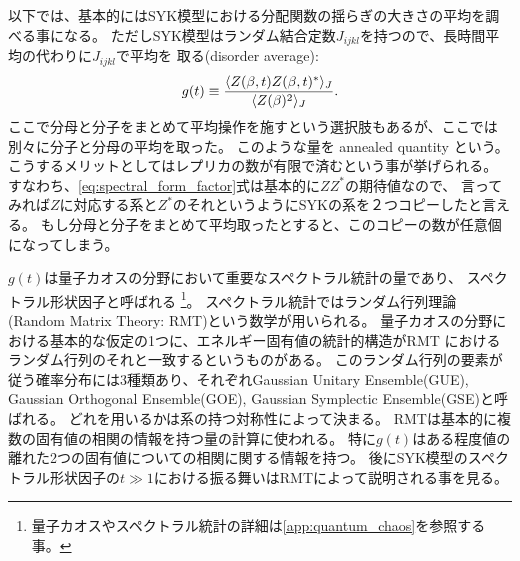 以下では、基本的にはSYK模型における分配関数の揺らぎの大きさの平均を調べる事になる。
ただしSYK模型はランダム結合定数$J_{ijkl}$を持つので、長時間平均の代わりに$J_{ijkl}$で平均を
取る(disorder average):
\begin{align}
	g(t) \equiv
	\frac{\langle Z(\beta, t)Z(\beta, t)^* \rangle_J}{\langle Z(\beta)^2 \rangle_J}.
	\label{eq:spectral_form_factor}
\end{align}
ここで分母と分子をまとめて平均操作を施すという選択肢もあるが、ここでは別々に分子と分母の平均を取った。
このような量を annealed quantity という。
こうするメリットとしてはレプリカの数が有限で済むという事が挙げられる。
すなわち、\eqref{eq:spectral_form_factor}式は基本的に$ZZ^*$の期待値なので、
言ってみれば$Z$に対応する系と$Z^*$のそれというようにSYKの系を２つコピーしたと言える。
もし分母と分子をまとめて平均取ったとすると、このコピーの数が任意個になってしまう。

$g(t)$は量子カオスの分野において重要なスペクトラル統計の量であり、
スペクトラル形状因子と呼ばれる
\footnote{量子カオスやスペクトラル統計の詳細は\ref{app:quantum_chaos}を参照する事。}。
スペクトラル統計ではランダム行列理論(Random Matrix Theory: RMT)という数学が用いられる。
量子カオスの分野における基本的な仮定の1つに、エネルギー固有値の統計的構造がRMT
におけるランダム行列のそれと一致するというものがある。
このランダム行列の要素が従う確率分布には3種類あり、それぞれGaussian Unitary Ensemble(GUE),
Gaussian Orthogonal Ensemble(GOE), Gaussian Symplectic Ensemble(GSE)と呼ばれる。
どれを用いるかは系の持つ対称性によって決まる。
RMTは基本的に複数の固有値の相関の情報を持つ量の計算に使われる。
特に$g(t)$はある程度値の離れた2つの固有値についての相関に関する情報を持つ。
後にSYK模型のスペクトラル形状因子の$t \gg 1$における振る舞いはRMTによって説明される事を見る。

